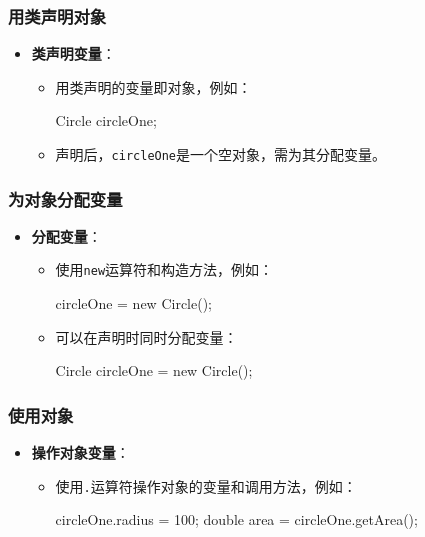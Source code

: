 \documentclass[a4paper, 10pt]{ctexart}
\begin{document}
\subsubsection{用类声明对象}
\begin{itemize}
  \item \textbf{类声明变量}：
  \begin{itemize}
    \item 用类声明的变量即对象，例如：
    \begin{codeblock}
Circle circleOne;
    \end{codeblock}
    \item 声明后，\texttt{circleOne}是一个空对象，需为其分配变量。
  \end{itemize}
\end{itemize}

\subsubsection{为对象分配变量}
\begin{itemize}
  \item \textbf{分配变量}：
  \begin{itemize}
    \item 使用\texttt{new}运算符和构造方法，例如：
    \begin{codeblock}
circleOne = new Circle();
    \end{codeblock}
    \item 可以在声明时同时分配变量：
    \begin{codeblock}
Circle circleOne = new Circle();
    \end{codeblock}
  \end{itemize}
\end{itemize}

\subsubsection{使用对象}
\begin{itemize}
  \item \textbf{操作对象变量}：
  \begin{itemize}
    \item 使用\texttt{.}运算符操作对象的变量和调用方法，例如：
    \begin{codeblock}
circleOne.radius = 100;
double area = circleOne.getArea();
    \end{codeblock}
  \end{itemize}
\end{itemize}
\end{document}
